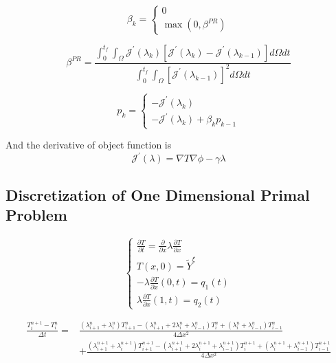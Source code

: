 \documentclass[UTF-8]{article}
\begin{document}
\begin{equation}
	\beta_k = 
	\left\{
	\begin{array}{l}
		0 \\
		\max(0, \beta^{PR})
	\end{array}
	\right.
\end{equation}

\begin{equation}
	\beta^{PR} = \frac{\int_{0}^{t_f} \int_{\Omega} \mathcal{J}^\prime(\lambda_k)\left[ \mathcal{J}^\prime(\lambda_k) - \mathcal{J}^\prime(\lambda_{k-1}) \right] d\Omega dt}{\int_{0}^{t_f} \int_{\Omega} \left[ \mathcal{J}^\prime(\lambda_{k-1}) \right]^2 d\Omega dt }
\end{equation}

\begin{equation}
	p_k =
	\left\{
	\begin{array}{l}
		-\mathcal{J}^\prime(\lambda_k) \\
		-\mathcal{J}^\prime(\lambda_k) + \beta_k p_{k-1}
	\end{array}
	\right.
\end{equation}

And the derivative of object function is
\begin{equation}
	\mathcal{J}^\prime(\lambda) = \nabla T \nabla \phi - \gamma \lambda
\end{equation}

\subsection{Discretization of One Dimensional Primal Problem}
\begin{equation}
	\left\{
	\begin{array}{l}
		\frac{\partial T}{\partial t} = \frac{\partial}{\partial x} \lambda \frac{\partial T}{\partial x} \\
		T(x, 0) = \tilde{Y}^\xi \\
		-\lambda \frac{\partial T}{\partial x}(0, t) = q_1(t) \\
		\lambda \frac{\partial T}{\partial x}(1, t) = q_2(t)
	\end{array}
	\right.
\end{equation}

\begin{align}
	\frac{T_{i}^{n+1} - T_{i}^n}{\Delta t} = & \frac{(\lambda_{i+1}^{n} + \lambda_{i}^{n}) T_{i+1}^{n} - (\lambda_{i+1}^{n} + 2 \lambda_{i}^{n} + \lambda_{i-1}^{n}) T_{i}^{n} + (\lambda_{i}^{n} + \lambda_{i-1}^{n}) T_{i-1}^{n}}{4 \Delta x^2} \\
	& + \frac{(\lambda_{i+1}^{n+1} + \lambda_{i}^{n+1}) T_{i+1}^{n+1} - (\lambda_{i+1}^{n+1} + 2 \lambda_{i}^{n+1} + \lambda_{i-1}^{n+1}) T_{i}^{n+1} + (\lambda_{i}^{n+1} + \lambda_{i-1}^{n+1}) T_{i-1}^{n+1}}{4 \Delta x^2}
\end{align}
\end{document}
